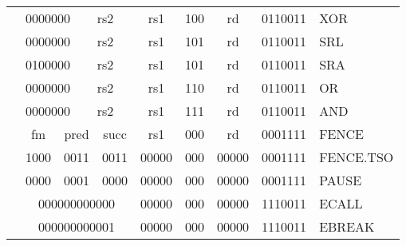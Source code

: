 \begin{table}[p]
\begin{small}
\begin{center}
\begin{tabular}{p{0in}p{0.4in}p{0.05in}p{0.05in}p{0.05in}p{0.05in}p{0.4in}p{0.6in}p{0.4in}p{0.6in}p{0.7in}l}
&
\multicolumn{4}{|c|}{0000000} &
\multicolumn{2}{c|}{rs2} &
\multicolumn{1}{c|}{rs1} &
\multicolumn{1}{c|}{100} &
\multicolumn{1}{c|}{rd} &
\multicolumn{1}{c|}{0110011} & XOR \\
\cline{2-11}


&
\multicolumn{4}{|c|}{0000000} &
\multicolumn{2}{c|}{rs2} &
\multicolumn{1}{c|}{rs1} &
\multicolumn{1}{c|}{101} &
\multicolumn{1}{c|}{rd} &
\multicolumn{1}{c|}{0110011} & SRL \\
\cline{2-11}


&
\multicolumn{4}{|c|}{0100000} &
\multicolumn{2}{c|}{rs2} &
\multicolumn{1}{c|}{rs1} &
\multicolumn{1}{c|}{101} &
\multicolumn{1}{c|}{rd} &
\multicolumn{1}{c|}{0110011} & SRA \\
\cline{2-11}


&
\multicolumn{4}{|c|}{0000000} &
\multicolumn{2}{c|}{rs2} &
\multicolumn{1}{c|}{rs1} &
\multicolumn{1}{c|}{110} &
\multicolumn{1}{c|}{rd} &
\multicolumn{1}{c|}{0110011} & OR \\
\cline{2-11}


&
\multicolumn{4}{|c|}{0000000} &
\multicolumn{2}{c|}{rs2} &
\multicolumn{1}{c|}{rs1} &
\multicolumn{1}{c|}{111} &
\multicolumn{1}{c|}{rd} &
\multicolumn{1}{c|}{0110011} & AND \\
\cline{2-11}


&
\multicolumn{2}{|c|}{fm} &
\multicolumn{3}{c|}{pred} &
\multicolumn{1}{c|}{succ} &
\multicolumn{1}{c|}{rs1} &
\multicolumn{1}{c|}{000} &
\multicolumn{1}{c|}{rd} &
\multicolumn{1}{c|}{0001111} & FENCE \\
\cline{2-11}


&
\multicolumn{2}{|c|}{1000} &
\multicolumn{3}{c|}{0011} &
\multicolumn{1}{c|}{0011} &
\multicolumn{1}{c|}{00000} &
\multicolumn{1}{c|}{000} &
\multicolumn{1}{c|}{00000} &
\multicolumn{1}{c|}{0001111} & FENCE.TSO \\
\cline{2-11}


&
\multicolumn{2}{|c|}{0000} &
\multicolumn{3}{c|}{0001} &
\multicolumn{1}{c|}{0000} &
\multicolumn{1}{c|}{00000} &
\multicolumn{1}{c|}{000} &
\multicolumn{1}{c|}{00000} &
\multicolumn{1}{c|}{0001111} & PAUSE \\
\cline{2-11}


&
\multicolumn{6}{|c|}{000000000000} &
\multicolumn{1}{c|}{00000} &
\multicolumn{1}{c|}{000} &
\multicolumn{1}{c|}{00000} &
\multicolumn{1}{c|}{1110011} & ECALL \\
\cline{2-11}


&
\multicolumn{6}{|c|}{000000000001} &
\multicolumn{1}{c|}{00000} &
\multicolumn{1}{c|}{000} &
\multicolumn{1}{c|}{00000} &
\multicolumn{1}{c|}{1110011} & EBREAK \\
\cline{2-11}


\end{tabular}
\end{center}
\end{small}

\end{table}


